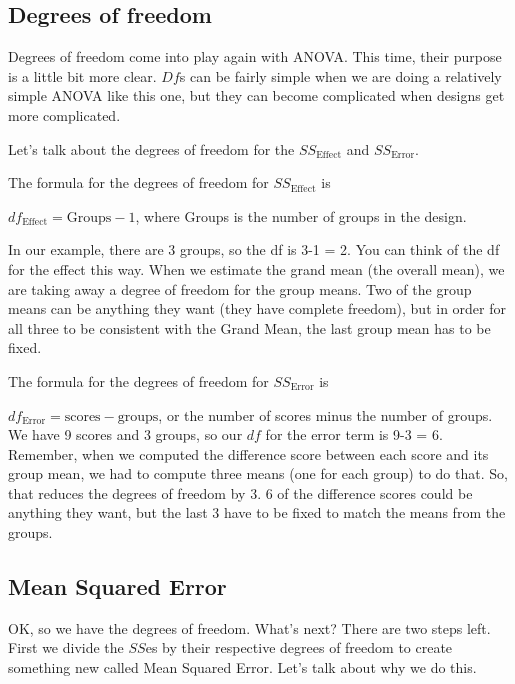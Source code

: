 \documentclass[
]{book}
\begin{document}
\hypertarget{degrees-of-freedom}{%
\subsection{Degrees of freedom}\label{degrees-of-freedom}}

Degrees of freedom come into play again with ANOVA. This time, their purpose is a little bit more clear. \(Df\)s can be fairly simple when we are doing a relatively simple ANOVA like this one, but they can become complicated when designs get more complicated.

Let's talk about the degrees of freedom for the \(SS_\text{Effect}\) and \(SS_\text{Error}\).

The formula for the degrees of freedom for \(SS_\text{Effect}\) is

\(df_\text{Effect} = \text{Groups} -1\), where Groups is the number of groups in the design.

In our example, there are 3 groups, so the df is 3-1 = 2. You can think of the df for the effect this way. When we estimate the grand mean (the overall mean), we are taking away a degree of freedom for the group means. Two of the group means can be anything they want (they have complete freedom), but in order for all three to be consistent with the Grand Mean, the last group mean has to be fixed.

The formula for the degrees of freedom for \(SS_\text{Error}\) is

\(df_\text{Error} = \text{scores} - \text{groups}\), or the number of scores minus the number of groups. We have 9 scores and 3 groups, so our \(df\) for the error term is 9-3 = 6. Remember, when we computed the difference score between each score and its group mean, we had to compute three means (one for each group) to do that. So, that reduces the degrees of freedom by 3. 6 of the difference scores could be anything they want, but the last 3 have to be fixed to match the means from the groups.

\hypertarget{mean-squared-error}{%
\subsection{Mean Squared Error}\label{mean-squared-error}}

OK, so we have the degrees of freedom. What's next? There are two steps left. First we divide the \(SS\)es by their respective degrees of freedom to create something new called Mean Squared Error. Let's talk about why we do this.
\end{document}
